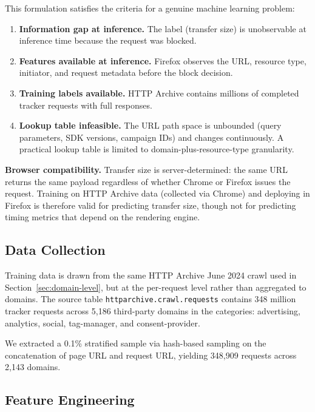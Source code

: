 \documentclass[11pt]{article}
\begin{document}
This formulation satisfies the criteria for a genuine machine learning problem:

\begin{enumerate}
    \item \textbf{Information gap at inference.} The label (transfer size) is unobservable at inference time because the request was blocked.
    \item \textbf{Features available at inference.} Firefox observes the URL, resource type, initiator, and request metadata before the block decision.
    \item \textbf{Training labels available.} HTTP Archive contains millions of completed tracker requests with full responses.
    \item \textbf{Lookup table infeasible.} The URL path space is unbounded (query parameters, SDK versions, campaign IDs) and changes continuously. A practical lookup table is limited to domain-plus-resource-type granularity.
\end{enumerate}

\textbf{Browser compatibility.} Transfer size is server-determined: the same URL returns the same payload regardless of whether Chrome or Firefox issues the request. Training on HTTP Archive data (collected via Chrome) and deploying in Firefox is therefore valid for predicting transfer size, though not for predicting timing metrics that depend on the rendering engine.

\subsection{Data Collection}

Training data is drawn from the same HTTP Archive June 2024 crawl used in Section~\ref{sec:domain-level}, but at the per-request level rather than aggregated to domains. The source table \texttt{httparchive.crawl.requests} contains 348 million tracker requests across 5,186 third-party domains in the categories: advertising, analytics, social, tag-manager, and consent-provider.

We extracted a 0.1\% stratified sample via hash-based sampling on the concatenation of page URL and request URL, yielding 348,909 requests across 2,143 domains.

\subsection{Feature Engineering}
\label{sec:features}
\end{document}
